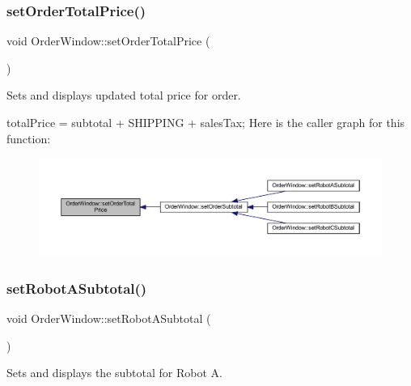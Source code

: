 \subsubsection{\texorpdfstring{set\+Order\+Total\+Price()}{setOrderTotalPrice()}}
{\footnotesize\ttfamily void Order\+Window\+::set\+Order\+Total\+Price (\begin{DoxyParamCaption}{ }\end{DoxyParamCaption})}



Sets and displays updated total price for order. 

total\+Price = subtotal + S\+H\+I\+P\+P\+I\+NG + sales\+Tax; Here is the caller graph for this function\+:\nopagebreak
\begin{figure}[H]
\begin{center}
\leavevmode
\includegraphics[width=350pt]{class_order_window_af1b6d198cf89a68c63afa28bc986786a_icgraph}
\end{center}
\end{figure}
\mbox{\label{class_order_window_a4fec739fb9e3c2c06fdf8afa7d94a4f9}} 
\subsubsection{\texorpdfstring{set\+Robot\+A\+Subtotal()}{setRobotASubtotal()}}
{\footnotesize\ttfamily void Order\+Window\+::set\+Robot\+A\+Subtotal (\begin{DoxyParamCaption}{ }\end{DoxyParamCaption})}



Sets and displays the subtotal for Robot A. 

